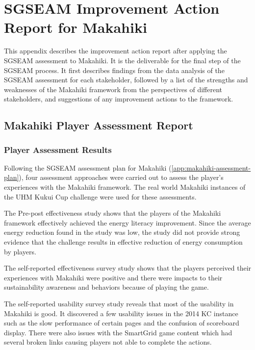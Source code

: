 \chapter{SGSEAM Improvement Action Report for Makahiki}
\label{app:makahiki-improvement-report}

This appendix describes the improvement action report after applying the SGSEAM assessment to Makahiki. It is the deliverable for the final step of the SGSEAM process. It first describes findings from the data analysis of the SGSEAM assessment for each stakeholder, followed by a list of the strengths and weaknesses of the Makahiki framework from the perspectives of different stakeholders, and suggestions of any improvement actions to the framework.

\section{Makahiki Player Assessment Report}

\subsection{Player Assessment Results}

Following the SGSEAM assessment plan for Makahiki (\autoref{app:makahiki-assessment-plan}), four assessment approaches were carried out to assess the player's experiences with the Makahiki framework. The real world Makahiki instances of the UHM Kukui Cup challenge were used for these assessments. 

The Pre-post effectiveness study shows that the players of the Makahiki framework effectively achieved the energy literacy improvement. Since the average energy reduction found in the study was low, the study did not provide strong evidence that the challenge results in effective reduction of energy consumption by players. 

The self-reported effectiveness survey study shows that the players perceived their experiences with Makahiki were positive and there were impacts to their sustainability awareness and behaviors because of playing the game. 

The self-reported usability survey study reveals that most of the usability in Makahiki is good. It discovered a few usability issues in the 2014 KC instance such as the slow performance of certain pages and the confusion of scoreboard display. There were also issues with the SmartGrid game content which had several broken links causing players not able to complete the actions. 

